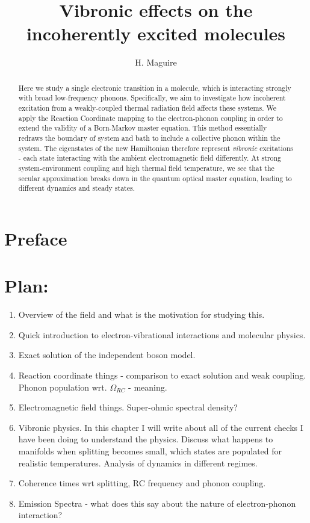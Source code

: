 \documentclass[]{article}
\title{Vibronic effects on the incoherently excited molecules}
\author[1]{H. Maguire}
\affil[1]{Photon Science Institute and School of Physics and Astronomy, The University of Manchester, Oxford Road,
	Manchester M13 9PL, United Kingdom}
\begin{document}
\tableofcontents
\section*{Preface}

\maketitle
\begin{abstract}
Here we study a single electronic transition in a molecule, which is interacting strongly with broad low-frequency phonons. Specifically, we aim to investigate how incoherent excitation from a weakly-coupled thermal radiation field affects these systems. We apply the Reaction Coordinate mapping to the electron-phonon coupling in order to extend the validity of a Born-Markov master equation. This method essentially redraws the boundary of system and bath to include a collective phonon within the system. The eigenstates of the new Hamiltonian therefore represent \textit{vibronic} excitations - each state interacting with the ambient electromagnetic field differently. At strong system-environment coupling and high thermal field temperature, we see that the secular approximation breaks down in the quantum optical master equation, leading to different dynamics and steady states.
\end{abstract}
 
\section{Plan:}
\begin{enumerate}
	\item Overview of the field and what is the motivation for studying this.
	\item Quick introduction to electron-vibrational interactions and molecular physics.
	\item Exact solution of the independent boson model.
	\item Reaction coordinate things - comparison to exact solution and weak coupling. Phonon population wrt. $\Omega_{RC}$ - meaning.
	\item Electromagnetic field things. Super-ohmic spectral density?
	\item Vibronic physics. In this chapter I will write about all of the current checks I have been doing to understand the physics. Discuss what happens to manifolds when splitting becomes small, which states are populated for realistic temperatures. Analysis of dynamics in different regimes.
	\item Coherence times wrt splitting, RC frequency and phonon coupling.
	\item Emission Spectra - what does this say about the nature of electron-phonon interaction?
\end{enumerate}
\end{document}
